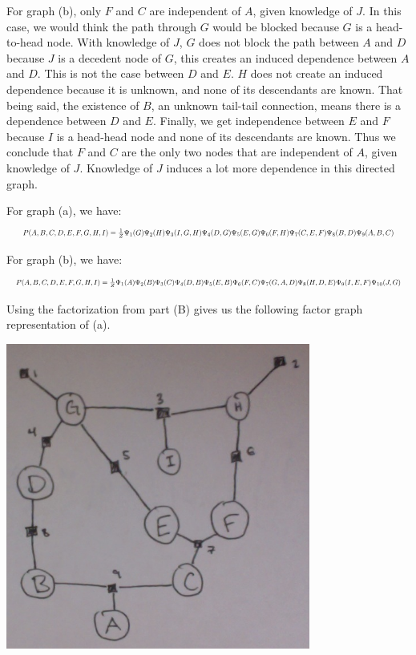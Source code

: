 \documentclass[solution, letterpaper]{cs121}
\begin{document}
\begin{empfile}
For graph (b), only $F$ and $C$ are independent of $A$, given knowledge of $J$. In this case, we would think the path through $G$ would be blocked because $G$ is a head-to-head node. With knowledge of $J$, $G$ does not block the path between $A$ and $D$ because $J$ is a decedent node of $G$, this creates an induced dependence between $A$ and $D$. This is not the case between $D$ and $E$. $H$ does not create an induced dependence because it is unknown, and none of its descendants are known. That being said, the existence of $B$, an unknown tail-tail connection, means there is a dependence between $D$ and $E$. Finally, we get independence between $E$ and $F$ because $I$ is a head-head node and none of its descendants are known. Thus we conclude that $F$ and $C$ are the only two nodes that are independent of $A$, given knowledge of $J$. Knowledge of $J$ induces a lot more dependence in this directed graph.

\subproblem %
For graph (a), we have:
\begin{equation*}
\resizebox{1\hsize}{!}{$P(A,B,C,D,E,F,G,H,I) = \frac{1}{Z}\Psi_1(G)\Psi_2(H)\Psi_3(I,G,H)\Psi_4(D,G)\Psi_5(E,G)\Psi_6(F,H)\Psi_7(C,E,F)\Psi_8(B,D)\Psi_9(A,B,C)$}
\end{equation*}

For graph (b), we have:
\begin{equation*}
\resizebox{1\hsize}{!}{$P(A,B,C,D,E,F,G,H,I) = \frac{1}{Z}\Psi_1(A)\Psi_2(B)\Psi_3(C)\Psi_4(D,B)\Psi_5(E,B)\Psi_6(F,C)\Psi_7(G,A,D)\Psi_8(H,D,E)\Psi_9(I,E,F)\Psi_{10}(J,G)$}
\end{equation*}

\pagebreak

\subproblem %
Using the factorization from part (B) gives us the following factor graph representation of (a).
\begin{center}
\includegraphics[width=100mm]{factor_graph_a.png}
\end{center}


\end{empfile}
\end{document}

